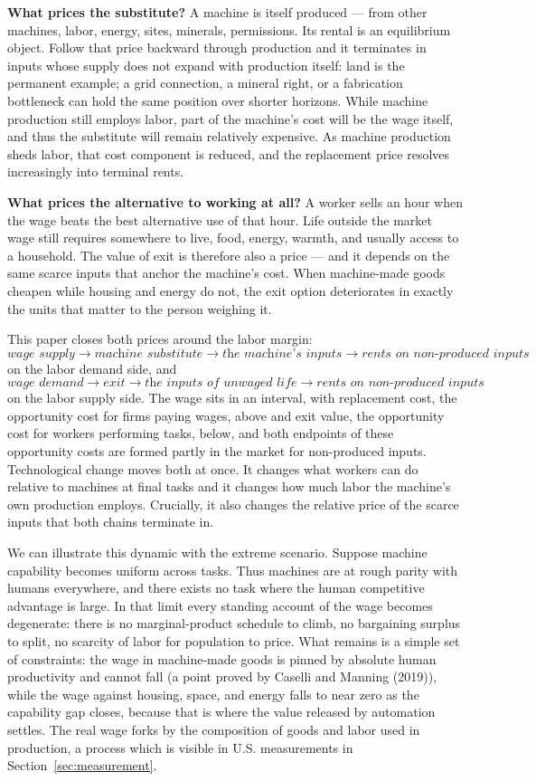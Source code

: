 \documentclass[12pt]{article}
\theoremstyle{plain}
\begin{document}
\textbf{What prices the substitute?} A machine is itself produced --- from other machines, labor, energy, sites, minerals, permissions. Its rental is an equilibrium object. Follow that price backward through production and it terminates in inputs whose supply does not expand with production itself: land is the permanent example; a grid connection, a mineral right, or a fabrication bottleneck can hold the same position over shorter horizons. While machine production still employs labor, part of the machine's cost will be the wage itself, and thus the substitute will remain relatively expensive. As machine production sheds labor, that cost component is reduced, and the replacement price resolves increasingly into terminal rents.

\textbf{What prices the alternative to working at all?} A worker sells an hour when the wage beats the best alternative use of that hour. Life outside the market wage still requires somewhere to live, food, energy, warmth, and usually access to a household. The value of exit is therefore also a price --- and it depends on the same scarce inputs that anchor the machine's cost. When machine-made goods cheapen while housing and energy do not, the exit option deteriorates in exactly the units that matter to the person weighing it.

This paper closes both prices around the labor margin:
\[
\textit{wage supply} \to \textit{machine substitute} \to \textit{the machine's inputs} \to \textit{rents on non-produced inputs}
\]
on the labor demand side, and
\[
\textit{wage demand} \to \textit{exit} \to \textit{the inputs of unwaged life} \to \textit{rents on non-produced inputs}
\]
on the labor supply side. The wage sits in an interval, with replacement cost, the opportunity cost for firms paying wages, above and exit value, the opportunity cost for workers performing tasks, below, and both endpoints of these opportunity costs are formed partly in the market for non-produced inputs. Technological change moves both at once. It changes what workers can do relative to machines at final tasks and it changes how much labor the machine's own production employs. Crucially, it also changes the relative price of the scarce inputs that both chains terminate in.

We can illustrate this dynamic with the extreme scenario. Suppose machine capability becomes uniform across tasks. Thus machines are at rough parity with humans everywhere, and there exists no task where the human competitive advantage is large. In that limit every standing account of the wage becomes degenerate: there is no marginal-product schedule to climb, no bargaining surplus to split, no scarcity of labor for population to price. What remains is a simple set of constraints: the wage in machine-made goods is pinned by absolute human productivity and cannot fall (a point proved by Caselli and Manning (2019)), while the wage against housing, space, and energy falls to near zero as the capability gap closes, because that is where the value released by automation settles. The real wage forks by the composition of goods and labor used in production, a process which is visible in U.S. measurements in Section~\ref{sec:measurement}.
\end{document}
